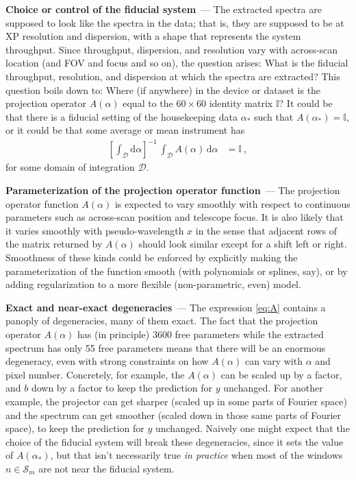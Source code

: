 \documentclass[11pt]{article}
\renewcommand{\paragraph}[1]{\medskip\par\noindent\textbf{#1}~---}
\newcommand{\dd}{\mathrm{d}}
\begin{document}
\paragraph{Choice or control of the fiducial system}
The extracted spectra are supposed to look like the spectra in the data; that is, they are supposed to be at XP resolution and dispersion, with a shape that represents the system throughput.
Since throughput, dispersion, and resolution vary with across-scan location (and FOV and focus and so on), the question arises:
What is the fiducial throughput, resolution, and dispersion at which the spectra are extracted?
This question boils down to:
Where (if anywhere) in the device or dataset is the projection operator $A(\alpha)$ equal to the $60\times 60$ identity matrix $\mathbb{I}$?
It could be that there is a fiducial setting of the housekeeping data $\alpha_\ast$ such that $A(\alpha_\ast)=\mathbb{I}$, or it could be that some average or mean instrument has
\begin{align}
    \left[\int_\mathscr{D} \dd\alpha\right]^{-1}\,\displaystyle\int_\mathscr{D} A(\alpha)\,\dd\alpha  &= \mathbb{I} ~,\label{eq:meanA}
\end{align}
for some domain of integration $\mathscr{D}$.

\paragraph{Parameterization of the projection operator function}
The projection operator function $A(\alpha)$ is expected to vary smoothly with respect to continuous parameters such as across-scan position and telescope focus.
It is also likely that it varies smoothly with pseudo-wavelength $x$ in the sense that adjacent rows of the matrix returned by $A(\alpha)$ should look similar except for a shift left or right.
Smoothness of these kinds could be enforced by explicitly making the parameterization of the function smooth (with polynomials or splines, say), or by adding regularization to a more flexible (non-parametric, even) model.

\paragraph{Exact and near-exact degeneracies}
The expression \eqref{eq:A} contains a panoply of degeneracies, many of them exact.
The fact that the projection operator $A(\alpha)$ has (in principle) 3600 free parameters while the extracted spectrum has only 55 free parameters means that there will be an enormous degeneracy, even with strong constraints on how $A(\alpha)$ can vary with $\alpha$ and pixel number.
Concretely, for example, the $A(\alpha)$ can be scaled up by a factor, and $b$ down by a factor to keep the prediction for $y$ unchanged.
For another example, the projector can get sharper (scaled up in some parts of Fourier space) and the spectrum can get smoother (scaled down in those same parts of Fourier space), to keep the prediction for $y$ unchanged.
Naively one might expect that the choice of the fiducial system will break these degeneracies, since it sets the value of $A(\alpha_\ast)$, but that isn't necessarily true \emph{in practice} when most of the windows $n\in\mathscr{S}_m$ are not near the fiducial system.
\end{document}
